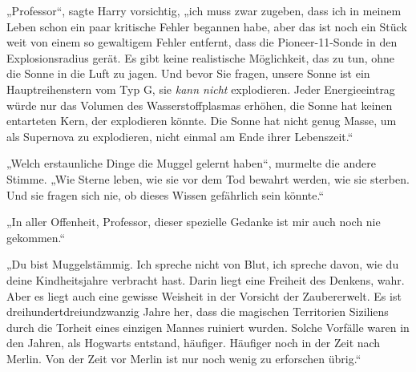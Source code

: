 „Professor“, sagte Harry vorsichtig, „ich muss zwar zugeben, dass ich in meinem Leben schon ein paar kritische Fehler begannen habe, aber das ist noch ein Stück weit von einem so gewaltigem Fehler entfernt, dass die Pioneer-11-Sonde in den Explosionsradius gerät. Es gibt keine realistische Möglichkeit, das zu tun, ohne die Sonne in die Luft zu jagen. Und bevor Sie fragen, unsere Sonne ist ein Hauptreihenstern vom Typ G, sie \emph{kann nicht} explodieren. Jeder Energieeintrag würde nur das Volumen des Wasserstoffplasmas erhöhen, die Sonne hat keinen entarteten Kern, der explodieren könnte. Die Sonne hat nicht genug Masse, um als Supernova zu explodieren, nicht einmal am Ende ihrer Lebenszeit.“

„Welch erstaunliche Dinge die Muggel gelernt haben“, murmelte die andere Stimme. „Wie Sterne leben, wie sie vor dem Tod bewahrt werden, wie sie sterben. Und sie fragen sich nie, ob dieses Wissen gefährlich sein könnte.“

„In aller Offenheit, Professor, dieser spezielle Gedanke ist mir auch noch nie gekommen.“

„Du bist Muggelstämmig. Ich spreche nicht von Blut, ich spreche davon, wie du deine Kindheitsjahre verbracht hast. Darin liegt eine Freiheit des Denkens, wahr. Aber es liegt auch eine gewisse Weisheit in der Vorsicht der Zaubererwelt. Es ist dreihundertdreiundzwanzig Jahre her, dass die magischen Territorien Siziliens durch die Torheit eines einzigen Mannes ruiniert wurden. Solche Vorfälle waren in den Jahren, als Hogwarts entstand, häufiger. Häufiger noch in der Zeit nach Merlin. Von der Zeit vor Merlin ist nur noch wenig zu erforschen übrig.“

